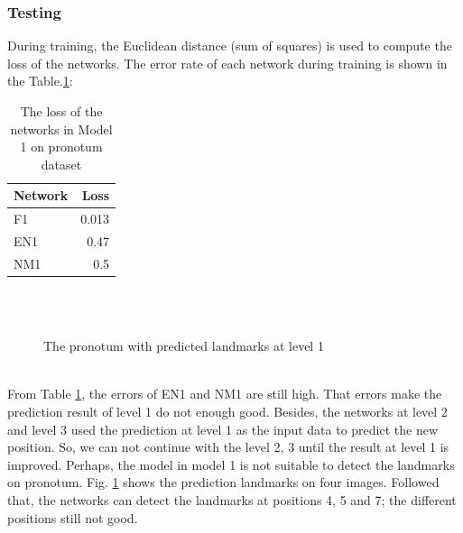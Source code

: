 \documentclass[12pt,a4paper]{article}
\begin{document}
\subsubsection{Testing}
During training, the Euclidean distance (sum of squares) is used to compute the loss of the networks. The error rate of each network during training is shown in the Table.\ref{model1p}:\\
\begin{table}[h!]
	\centering
	\begin{tabular}{l r}
	Network & Loss \\ \hline
	F1 & 0.013 \\ \hline
	EN1 & 0.47\\ \hline
	NM1 &  0.5
	\end{tabular}
	\caption{The loss of the networks in Model 1 on pronotum dataset}
	\label{model1p}
\end{table}
\begin{figure}[h!]
\centering
{}~~
\\
~~
\\
\caption{The pronotum with predicted landmarks at level 1}
\label{model1pTest}
\end{figure}\\
From Table \ref{model1p}, the errors of EN1 and NM1 are still high. That errors make the prediction result of level 1 do not enough good. Besides, the networks at level 2 and level 3 used the prediction at level 1 as the input data to predict the new position. So, we can not continue with the level 2, 3 until the result at level 1 is improved. Perhaps, the model in model 1 is not suitable to detect the landmarks on pronotum.  Fig. \ref{model1pTest} shows the prediction landmarks on four images. Followed that, the networks can detect the landmarks at positions 4, 5 and 7; the different positions still not good.
\end{document}
